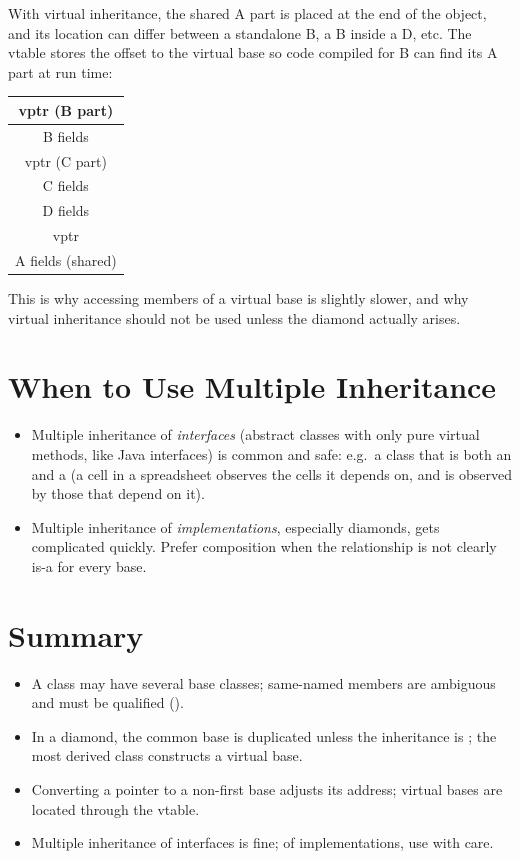 With virtual inheritance, the shared A part is placed at the end of the object,
and its location can differ between a standalone B, a B inside a D, etc. The
vtable stores the offset to the virtual base so code compiled for B can find its
A part at run time:
\begin{center}
\begin{tabular}{|c|}
\hline
vptr (B part) \\ \hline
B fields \\ \hline
vptr (C part) \\ \hline
C fields \\ \hline
D fields \\ \hline
vptr \\ \hline
A fields (shared) \\ \hline
\end{tabular}
\end{center}
This is why accessing members of a virtual base is slightly slower, and why
virtual inheritance should not be used unless the diamond actually arises.

\section{When to Use Multiple Inheritance}
\begin{itemize}
  \item Multiple inheritance of \emph{interfaces} (abstract classes with only
        pure virtual methods, like Java interfaces) is common and safe: e.g.\ a
        class that is both an  and a  (a cell in a
        spreadsheet observes the cells it depends on, and is observed by those
        that depend on it).
  \item Multiple inheritance of \emph{implementations}, especially diamonds, gets
        complicated quickly. Prefer composition when the relationship is not
        clearly is-a for every base.
\end{itemize}

\section*{Summary}
\begin{itemize}
  \item A class may have several base classes; same-named members are ambiguous
        and must be qualified ().
  \item In a diamond, the common base is duplicated unless the inheritance is
        ; the most derived class constructs a virtual base.
  \item Converting a pointer to a non-first base adjusts its address; virtual
        bases are located through the vtable.
  \item Multiple inheritance of interfaces is fine; of implementations, use with
        care.
\end{itemize}
